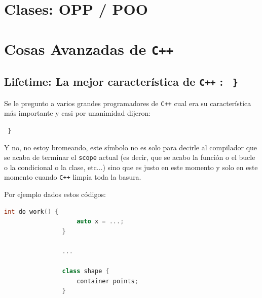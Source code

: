 \documentclass[12pt, fleqn]{report}                             %
\theoremstyle{break}                                            %
\newcommand \Cpp  {\texttt{C++} }                               %
\begin{document}
    \clearpage
    \chapter{Clases: OPP / POO}


    \clearpage
    \chapter{Cosas Avanzadas de \Cpp}

        \section{Lifetime: La mejor característica de \Cpp: \texttt{ \} } }     
        
            Se le pregunto a varios grandes programadores de \Cpp cual era su
            característica más importante y casi por unanimidad dijeron:

            \texttt{ \} }

            Y no, no estoy bromeando, este símbolo no es solo para decirle al compilador
            que se acaba de terminar el \texttt{scope} actual (es decir, que se acabo 
            la función o el bucle o la condicional o la clase, etc...) sino que es justo
            en este momento y solo en este momento cuando \Cpp limpia toda la basura.

            Por ejemplo dados estos códigos:
            \begin{lstlisting}[language=C++, gobble=16]
                int do_work() {
                    auto x = ...;
                }

                ...

                class shape {
                    container points;
                }
            \end{lstlisting}
\end{document}
